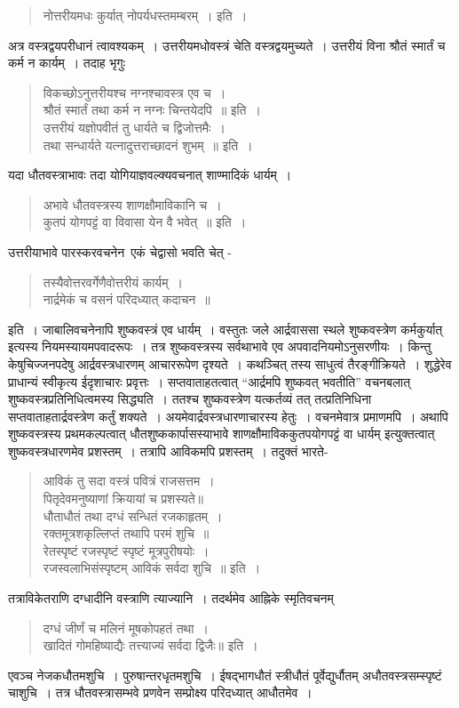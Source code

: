{\begin{verse}
नोत्तरीयमधः कुर्यात् नोपर्यधस्तमम्बरम्~। इति~। 
\end{verse}
अत्र वस्त्रद्वयपरीधानं त्वावश्यकम्~। उत्तरीयमधोवस्त्रं चेति वस्त्रद्वयमुच्यते~। उत्तरीयं विना श्रौतं स्मार्तं च कर्म न कार्यम्~। तदाह भृगुः \ 
\begin{verse}
विकच्छोऽनुत्तरीयश्च नग्नश्चावस्त्र एव च~। \\
श्रौतं स्मार्तं तथा कर्म न नग्नः चिन्तयेदपि~॥ इति~। \\
उत्तरीयं यज्ञोपवीतं तु  धार्यते च द्विजोत्तमैः~। \\
तथा सन्धार्यते यत्नादुत्तराच्छादनं शुभम्~॥ इति~। 
\end{verse}
यदा धौतवस्त्राभावः तदा योगियाज्ञवल्क्यवचनात् शाण्मादिकं धार्यम्~। 
\begin{verse}
अभावे धौतवस्त्रस्य शाणक्षौमाविकानि च~। \\
कुतपं योगपट्टं वा विवासा येन वै भवेत्~॥ इति~। 
\end{verse}
उत्तरीयाभावे पारस्करवचनेन\ एकं चेद्वासो भवति चेत् -
\begin{verse}
तस्यैवोत्तरवर्गेणैवोत्तरीयं कार्यम्~। \\
नार्द्रमेकं च वसनं परिदध्यात् कदाचन~॥ 
\end{verse}
इति~। जाबालिवचनेनापि शुष्कवस्त्रं एव धार्यम्~। वस्तुतः जले आर्द्रवाससा स्थले शुष्कवस्त्रेण कर्मकुर्यात् इत्यस्य नियमस्यायमपवादरूपः~। तत्र शुष्कवस्त्रस्य सर्वथाभावे एव अपवादनियमोऽनुसरणीयः~। किन्तु केषुचिज्जनपदेषु आर्द्रवस्त्रधारणम् आचाररूपेण दृश्यते~। कथञ्चित् तस्य साधुत्वं तैरङ्गीक्रियते~। शुद्धेरेव प्राधान्यं स्वीकृत्य ईदृशाचारः प्रवृत्तः~। सप्तवाताहतत्वात् “आर्द्रमपि शुष्कवत् भवतीति” वचनबलात् शुष्कवस्त्रप्रतिनिधित्वमस्य सिद्ध्यति~। ततश्च शुष्कवस्त्रेण यत्कर्तव्यं तत् तत्प्रतिनिधिना सप्तवाताहतार्द्रवस्त्रेण कर्तुं शक्यते~। अयमेवार्द्रवस्त्रधारणाचारस्य हेतुः~। वचनमेवात्र प्रमाणमपि~। अथापि शुष्कवस्त्रस्य प्रथमकल्पत्वात् धौतशुष्ककार्पासस्याभावे शाणक्षौमाविककुतपयोगपट्टं वा धार्यम् इत्युक्तत्वात् शुष्कवस्त्रधारणमेव प्रशस्तम्~। तत्रापि आविकमपि प्रशस्तम्~। तदुक्तं भारते- 
\begin{verse}
आविकं तु सदा वस्त्रं पवित्रं राजसत्तम~। \\
पितृदेवमनुष्याणां क्रियायां च प्रशस्यते॥ \\
धौताधौतं तथा दग्धं सन्धितं रजकाहृतम्~। \\
रक्तमूत्रशकृल्लिप्तं तथापि परमं शुचि~॥\\
रेतस्पृष्टं रजस्पृष्टं स्पृष्टं मूत्रपुरीषयोः~। \\
रजस्वलाभिसंस्पृष्टम् आविकं सर्वदा शुचि~॥ इति~। 
\end{verse}
तत्राविकेतराणि दग्धादीनि वस्त्राणि त्याज्यानि~। तदर्थमेव आह्निके स्मृतिवचनम् 
\begin{verse}
दग्धं जीर्णं च मलिनं मूषकोपहतं तथा~। \\
खादितं गोमहिष्याद्यैः तत्त्याज्यं सर्वदा द्विजैः॥ इति~। 
\end{verse}
एवञ्च नेजकधौतमशुचि~। पुरुषान्तरधृतमशुचि~। ईषद्भागधौतं स्त्रीधौतं पूर्वेद्युर्धौतम् अधौतवस्त्रसम्स्पृष्टं चाशुचि~। तत्र धौतवस्त्रासम्भवे प्रणवेन सम्प्रोक्ष्य परिदध्यात् आधौतमेव~। 

}
